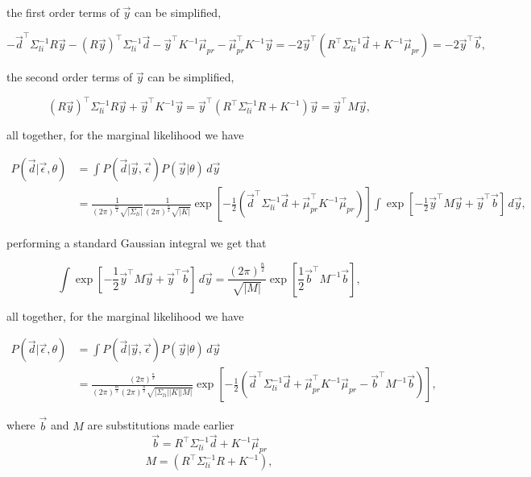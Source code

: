 \noindent the first order terms of $\vec y$ can be simplified,

$$
-\vec d^\top \Sigma_{li}^{-1} R\vec y - (R\vec y)^\top \Sigma_{li}^{-1} \vec d - \vec y^\top K^{-1} \vec \mu_{pr} - \vec \mu_{pr}^\top K^{-1} \vec y = -2 \vec y^\top ( R^{\top} \Sigma_{li}^{-1}\vec d + K^{-1} \vec \mu_{pr}) =-2 \vec y^\top \vec b,
$$

\noindent the second order terms of $\vec y$ can be simplified,

$$
(R\vec y)^\top \Sigma_{li}^{-1} R\vec y + \vec y^\top K^{-1} \vec y = \vec y^\top (R^\top \Sigma_{li}^{-1} R + K^{-1}) \vec y = \vec y^\top M \vec y,
$$

\noindent all together, for the marginal likelihood we have

\begin{equation}
\begin{aligned}
 P(\vec d|\vec\epsilon,\theta) 
 &= \int P(\vec{d}|\vec{y},\vec\epsilon)P(\vec{y}|\theta)  \, d\vec y \\
 &= \frac{1}{(2\pi)^{\frac{m}{2}} \sqrt{|\Sigma_{li}|}} \frac{1}{(2\pi)^{\frac{n}{2}} \sqrt{|K|}} \exp\left[ -\frac{1}{2}(\vec d ^\top \Sigma_{li}^{-1} \vec d + \vec \mu_{pr}^\top K^{-1} \vec \mu_{pr} )\right] \int \exp\left[-\frac{1}{2}\vec y^\top M \vec y + \vec y^\top \vec b\right] \, d\vec y, 
\end{aligned}
\end{equation}

\noindent performing a standard Gaussian integral we get that

$$
\int \exp\left[-\frac{1}{2}\vec y^\top M \vec y + \vec y^\top \vec b\right] \, d\vec y =  \frac{(2\pi)^\frac{n}{2}}{\sqrt{|M|}} \exp \left[ \frac{1}{2} \vec b^\top M^{-1}\vec b \right],
$$

\noindent all together, for the marginal likelihood we have

$$
\begin{aligned}
 P(\vec d|\vec\epsilon,\theta) &= \int P(\vec{d}|\vec{y},\vec\epsilon)P(\vec{y}|\theta)  \, d\vec y\\
 &= \frac{(2\pi)^{\frac{n}{2}}}{(2\pi)^{\frac{m}{2}} (2\pi)^{\frac{n}{2}} \sqrt{|\Sigma_{li}||K||M|}} \exp\left[ -\frac{1}{2}(\vec d ^\top \Sigma_{li}^{-1} \vec d + \vec \mu_{pr}^\top K^{-1} \vec \mu_{pr} - \vec b^\top M^{-1}\vec b )\right],
\end{aligned}
$$

\noindent where $\vec b$ and $M$ are substitutions made earlier
$$
\vec b = R^{\top} \Sigma_{li}^{-1}\vec d + K^{-1} \vec \mu_{pr}
$$
$$
M = (R^\top \Sigma_{li}^{-1} R + K^{-1}),
$$

